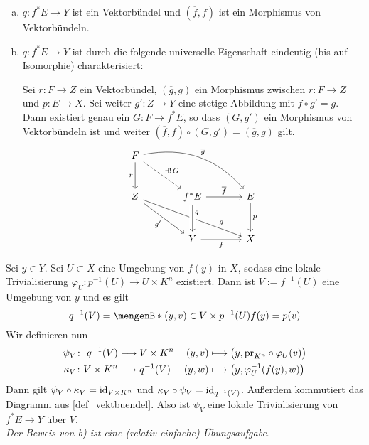\begin{lemma}[{name=[Universelle Eigenschaft des Pullbacks]}]
\leavevmode
\begin{enumerate}[a)]
	\item $q \colon f^* E \to Y$ ist ein Vektorbündel und $(\overline{f},f)$ ist ein Morphismus von Vektorbündeln. 
	\item $q \colon f^* E \to Y$ ist durch die folgende universelle Eigenschaft eindeutig (bis auf Isomorphie) charakterisiert:
	
	Sei $r \colon F \to Z$ ein Vektorbündel, $(\overline{g},g)$ ein Morphismus zwischen $r \colon F \to Z$ und $p \colon E \to X$. Sei weiter $g' \colon Z \to Y$ eine 
	stetige Abbildung mit $f \circ g' = g$. Dann existiert genau ein $G \colon F \to f^* E$, so dass $(G,g')$ ein Morphismus von Vektorbündeln ist und weiter 
	$(\overline{f},f) \circ (G,g')= (\overline{g},g)$ gilt.
	\[
		\begin{tikzcd}[sep=large]
			F \drar["\exists!\, G", dashed] \dar["r"'] \arrow[bend left,"\overline{g}"]{drr} & & \\
			Z \drar["g'"'] \arrow["g" near end]{drr} & f^* E \rar["\overline{f}"] \dar["q" pos=0.3,crossing over] & E \dar["p"]\\
			& Y \rar["f"'] & X
		\end{tikzcd}
	\]
\end{enumerate}	
\end{lemma}
\begin{beweis}
Sei $y\in Y$. Sei $U \subset X$ eine Umgebung von $f(y)$ in $X$, sodass eine lokale Trivialisierung $\varphi_U \colon p ^{-1}(U) \to U \times K^n$ existiert. Dann ist 
$V:= f^{-1}(U)$ eine Umgebung von $y$ und es gilt
\[
	q ^{-1}(V) = \set[(y,v) \in V \times p ^{-1}(U)]{f(y)=p(v)} 
\]
Wir definieren nun 
\begin{align*}
	\psi_V \colon \,\,q ^{-1}(V) &\longrightarrow V \times K^n &  (y,v)&\longmapsto \enbrace[\big]{y, \pr_{K^n} \circ \varphi_U(v)} \\
	\kappa_V \colon V \times K^n &\longrightarrow q ^{-1}(V) &  (y,w) &\longmapsto \enbrace*{y, \varphi_U^{-1} \enbrace*{f(y),w} } 
\end{align*}
Dann gilt $\psi_V \circ \kappa_V=\operatorname{id}_{V \times K^n}$ und $\kappa_V \circ \psi_V = \operatorname{id}_{q^{-1}(V)}$. Außerdem kommutiert das Diagramm aus \autoref{def_vektbuendel}. Also ist 
$\psi_V$ eine lokale Trivialisierung von $f^*E \to Y$ über $V$. \\
\emph{Der Beweis von b) ist eine (relativ einfache) Übungsaufgabe}.
\end{beweis}

